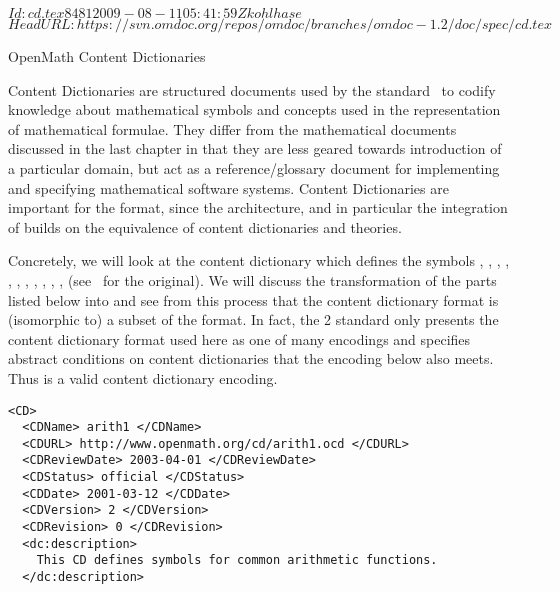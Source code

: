 \svnInfo $Id: cd.tex 8481 2009-08-11 05:41:59Z kohlhase $
\svnKeyword $HeadURL: https://svn.omdoc.org/repos/omdoc/branches/omdoc-1.2/doc/spec/cd.tex $

\begin{tchapter}[id=omcds]{OpenMath Content Dictionaries}

  Content Dictionaries are structured documents used by the {\openmath}
  standard~\cite{BusCapCar:2oms04} to codify knowledge about mathematical symbols and
  concepts used in the representation of mathematical formulae. They differ from the
  mathematical documents discussed in the last chapter in that they are less geared
  towards introduction of a particular domain, but act as a reference/glossary document
  for implementing and specifying mathematical software systems. Content Dictionaries are
  important for the {\omdoc} format, since the {\omdoc} architecture, and in particular
  the integration of {\openmath} builds on the equivalence of {\openmath} content
  dictionaries and {\omdoc} theories.

  Concretely, we will look at the content dictionary {} which defines
  the {\openmath} symbols {}, {}, {},
  {}, {}, {}, {},
  {}, {}, {}, {},
  {} (see~\cite{URL:omcd-core} for the original). We will discuss
  the transformation of the parts listed below into {\omdoc} and see from this process
  that the {\openmath} content dictionary format is (isomorphic to) a subset of the
  {\omdoc} format.  In fact, the {\openmath}2 standard only presents the content
  dictionary format used here as one of many encodings and specifies abstract conditions
  on content dictionaries that the {\omdoc} encoding below also meets. Thus {\omdoc} is a
  valid content dictionary encoding.

\begin{lstlisting}[language=omCD,label=lst:omcd,mathescape,
    caption={Part of the {\openmath} content dictionary {\snippet{arith1.ocd}}}]
<CD>
  <CDName> arith1 </CDName>
  <CDURL> http://www.openmath.org/cd/arith1.ocd </CDURL>
  <CDReviewDate> 2003-04-01 </CDReviewDate>
  <CDStatus> official </CDStatus>
  <CDDate> 2001-03-12 </CDDate>
  <CDVersion> 2 </CDVersion>
  <CDRevision> 0 </CDRevision>
  <dc:description> 
    This CD defines symbols for common arithmetic functions.
  </dc:description>


\end{lstlisting}
\end{tchapter}
